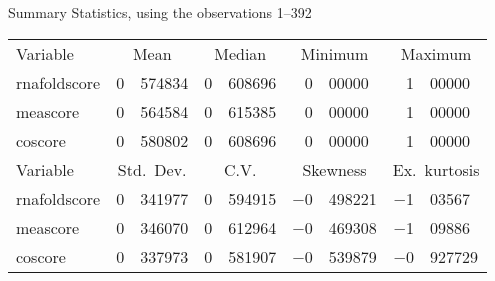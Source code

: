 \documentclass[11pt]{article}
\begin{document}
\thispagestyle{empty}

\begin{center}
Summary Statistics, using the observations 1--392\\

\vspace{8pt}

\begin{tabular}{lr@{.}lr@{.}lr@{.}lr@{.}l}
Variable & \multicolumn{2}{c}{Mean}%
 & \multicolumn{2}{c}{Median}%
  & \multicolumn{2}{c}{Minimum}%
   & \multicolumn{2}{c}{Maximum} \\[1ex]
rnafoldscore & 0&574834 & 0&608696 & 0&00000 & 1&00000\\
meascore & 0&564584 & 0&615385 & 0&00000 & 1&00000\\
coscore & 0&580802 & 0&608696 & 0&00000 & 1&00000\\[10pt]

Variable &  \multicolumn{2}{c}{Std.\ Dev.}%
 & \multicolumn{2}{c}{C.V.}%
  & \multicolumn{2}{c}{Skewness}%
   & \multicolumn{2}{c}{Ex.\ kurtosis} \\[1ex]
rnafoldscore & 0&341977 & 0&594915 & $-$0&498221 & $-$1&03567\\
meascore & 0&346070 & 0&612964 & $-$0&469308 & $-$1&09886\\
coscore & 0&337973 & 0&581907 & $-$0&539879 & $-$0&927729\\
\end{tabular}
\end{center}
\end{document}
